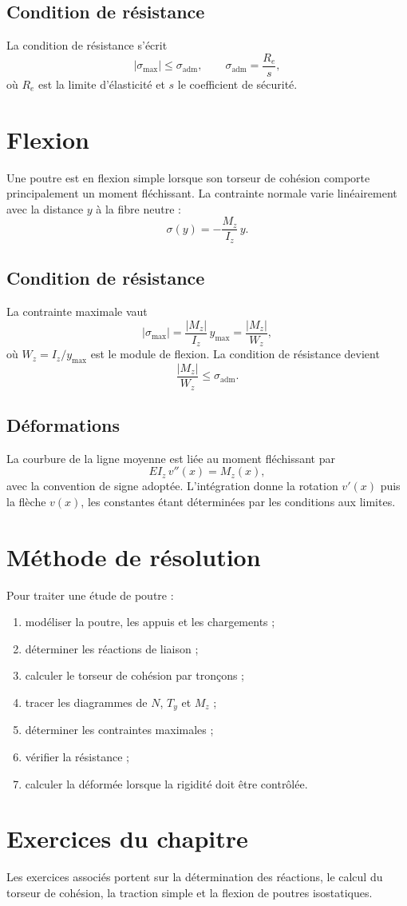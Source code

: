 \subsection{Condition de résistance}
La condition de résistance s'écrit
\[
|\sigma_{\max}|\leq \sigma_{\mathrm{adm}},
\qquad
\sigma_{\mathrm{adm}}=\frac{R_e}{s},
\]
où $R_e$ est la limite d'élasticité et $s$ le coefficient de sécurité.

\section{Flexion}
Une poutre est en flexion simple lorsque son torseur de cohésion comporte principalement un moment fléchissant. La contrainte normale varie linéairement avec la distance $y$ à la fibre neutre :
\[
\sigma(y)=-\frac{M_z}{I_z}\,y.
\]
\TLDistributionContrainteFlexion

\subsection{Condition de résistance}
La contrainte maximale vaut
\[
|\sigma_{\max}|=\frac{|M_z|}{I_z}\,y_{\max}
=\frac{|M_z|}{W_z},
\]
où $W_z=I_z/y_{\max}$ est le module de flexion. La condition de résistance devient
\[
\frac{|M_z|}{W_z}\leq \sigma_{\mathrm{adm}}.
\]

\subsection{Déformations}
La courbure de la ligne moyenne est liée au moment fléchissant par
\[
EI_z\,v''(x)=M_z(x),
\]
avec la convention de signe adoptée. L'intégration donne la rotation $v'(x)$ puis la flèche $v(x)$, les constantes étant déterminées par les conditions aux limites.
\TLDiagrammeFlexion

\section{Méthode de résolution}
Pour traiter une étude de poutre :
\begin{enumerate}
\item modéliser la poutre, les appuis et les chargements ;
\item déterminer les réactions de liaison ;
\item calculer le torseur de cohésion par tronçons ;
\item tracer les diagrammes de $N$, $T_y$ et $M_z$ ;
\item déterminer les contraintes maximales ;
\item vérifier la résistance ;
\item calculer la déformée lorsque la rigidité doit être contrôlée.
\end{enumerate}

\section{Exercices du chapitre}
Les exercices associés portent sur la détermination des réactions, le calcul du torseur de cohésion, la traction simple et la flexion de poutres isostatiques.

